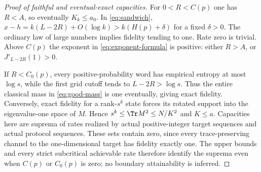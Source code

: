 \begin{proof}[Proof of faithful and eventual-exact capacities]
For $0<R<C(p)$ one has $R<A$, so eventually $K_k\le a_0$. In \eqref{eq:sandwich},
$x-h=k(L-2R)+O(\log k)>k(H(p)+\delta)$ for a fixed $\delta>0$. The ordinary law of large numbers implies fidelity tending to one. Rate zero is trivial. Above $C(p)$ the exponent in \eqref{eq:exponent-formula} is positive: either $R>A$, or $J'_{L-2R}(1)>0$.

If $R<C_0(p)$, every positive-probability word has empirical entropy at most $\log s$, while the first grid cutoff tends to $L-2R>\log s$. Thus the entire classical mass in \eqref{eq:good-mass} is one eventually, giving exact fidelity. Conversely, exact fidelity for a rank-$s^k$ state forces its rotated support into the eigenvalue-one space of $M$. Hence $s^k\le\Tr M^2\le N/K^2$ and $K\le a$. Capacities here are suprema of rates realized by actual positive-integer target sequences and actual protocol sequences. These sets contain zero, since every trace-preserving channel to the one-dimensional target has fidelity exactly one. The upper bounds and every strict subcritical achievable rate therefore identify the suprema even when $C(p)$ or $C_0(p)$ is zero; no boundary attainability is inferred.
\end{proof}

